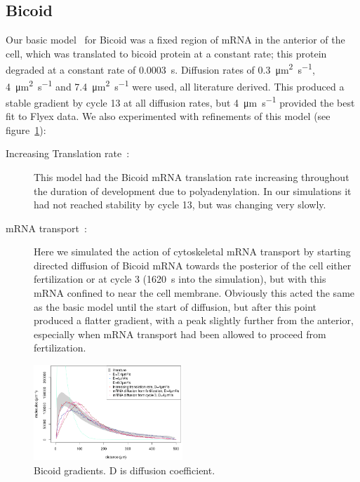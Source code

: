 \documentclass[11pt,a4paper,twocolumn]{article}
\begin{document}
\subsection{Bicoid}
Our basic model~\cite{Grimm2010} for Bicoid was a fixed region of mRNA in the anterior of the cell, which was translated to bicoid protein at a constant rate; this protein degraded at a constant rate of \SI{0.0003}{\second}. Diffusion rates of \SI{0.3}{\micro\metre\squared\per\second}, \SI{4}{\micro\metre\squared\per\second} and \SI{7.4}{\micro\metre\squared\per\second} were used, all literature derived. This produced a stable gradient by cycle 13 at all diffusion rates, but  \SI{4}{\micro\metre\per\second} provided the best fit to Flyex data.  We also experimented with refinements of this model (see figure~\ref{fig:bcd-grads}):
\begin{description}
\item[Increasing Translation rate~\cite{Holloway2011}:]
This model had the Bicoid mRNA translation rate increasing throughout the duration of development due to polyadenylation. In our simulations it had not reached stability by cycle 13, but was changing very slowly.
\item[mRNA transport~\cite{Spirov2009}:]
Here we simulated the action of cytoskeletal mRNA transport by starting directed diffusion of Bicoid mRNA towards the posterior of the cell either fertilization or at cycle 3 (\SI{1620}{\second} into the simulation), but with this mRNA confined to near the cell membrane. Obviously this acted the same as the basic model until the start of diffusion, but after this point produced a flatter gradient, with a peak slightly further from the anterior, especially when mRNA transport had been allowed to proceed from fertilization.
\end{description}

\begin{figure}[h]
\includegraphics[width=0.5\textwidth]{writeup-bcd-diffusion}
\caption{Bicoid gradients. D is diffusion coefficient. \label{fig:bcd-grads}}
\end{figure}
\end{document}
